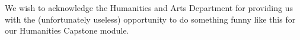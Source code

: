 \documentclass[%
 reprint,
 amsmath,amssymb,
 aps,
]{revtex4-2}
\begin{document}
\begin{acknowledgments}
We wish to acknowledge the Humanities and Arts Department for providing us with the (unfortunately useless) opportunity to do something funny like this for our Humanities Capstone module.
\end{acknowledgments}


\nocite{*}

\end{document}
